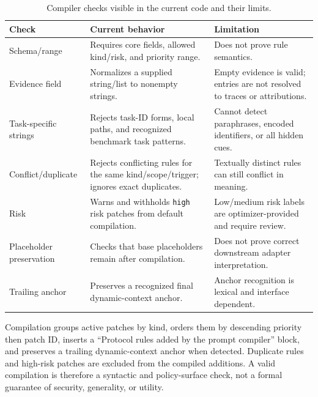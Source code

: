\documentclass[10pt]{article}
\begin{document}
\begin{table}[t]
\centering
\caption{Compiler checks visible in the current code and their limits.}
\small
\begin{tabular}{p{3.4cm}p{3.9cm}p{3.9cm}}
\toprule
Check & Current behavior & Limitation \\
\midrule
Schema/range & Requires core fields, allowed kind/risk, and priority range. & Does not prove rule semantics. \\
Evidence field & Normalizes a supplied string/list to nonempty strings. & Empty evidence is valid; entries are not resolved to traces or attributions. \\
Task-specific strings & Rejects task-ID forms, local paths, and recognized benchmark task patterns. & Cannot detect paraphrases, encoded identifiers, or all hidden cues. \\
Conflict/duplicate & Rejects conflicting rules for the same kind/scope/trigger; ignores exact duplicates. & Textually distinct rules can still conflict in meaning. \\
Risk & Warns and withholds \texttt{high} risk patches from default compilation. & Low/medium risk labels are optimizer-provided and require review. \\
Placeholder preservation & Checks that base placeholders remain after compilation. & Does not prove correct downstream adapter interpretation. \\
Trailing anchor & Preserves a recognized final dynamic-context anchor. & Anchor recognition is lexical and interface dependent. \\
\bottomrule
\end{tabular}
\end{table}

Compilation groups active patches by kind, orders them by descending priority then patch ID, inserts a ``Protocol rules added by the prompt compiler'' block, and preserves a trailing dynamic-context anchor when detected. Duplicate rules and high-risk patches are excluded from the compiled additions. A valid compilation is therefore a syntactic and policy-surface check, not a formal guarantee of security, generality, or utility.
\end{document}
